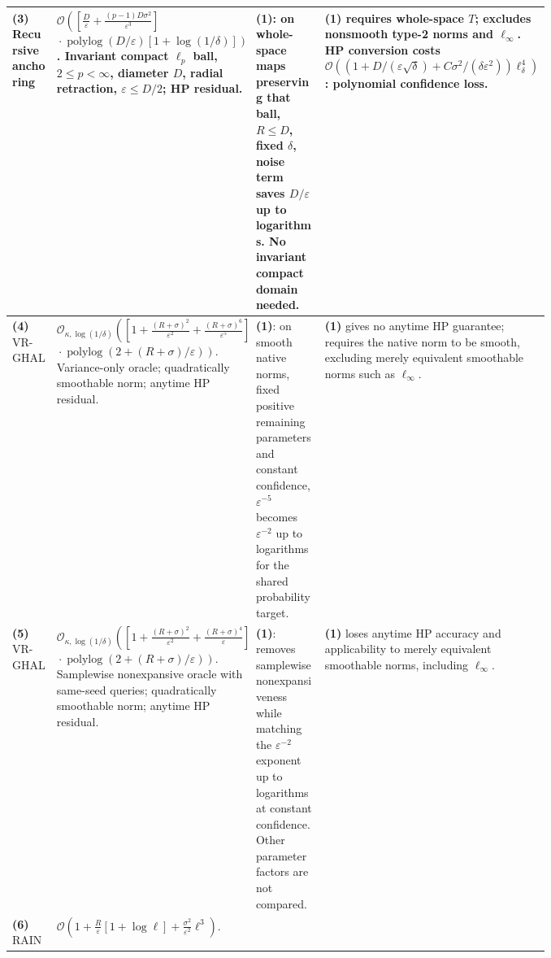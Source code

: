 \begin{table}[tp]
\begin{threeparttable}
\begin{tabularx}{\linewidth}{@{}>{\raggedright\arraybackslash}p{0.20\linewidth}>{\raggedright\arraybackslash}p{0.32\linewidth}>{\raggedright\arraybackslash}p{0.25\linewidth}>{\raggedright\arraybackslash}X@{}}
\midrule
\textbf{(3)} Recursive anchoring \citep[Thm.~5, Cor.~6]{ssbfpDgm2026v1}
& $\mathcal{O}\!\left(\left[\frac D\varepsilon+\frac{(p-1)D\sigma^2}{\varepsilon^3}\right]\right.$\newline
$\left.{}\cdot\operatorname{polylog}(D/\varepsilon)[1+\log(1/\delta)]\right)$.
Invariant compact $\ell_p$ ball, $2\leq p<\infty$, diameter $D$, radial retraction, $\varepsilon\leq D/2$; HP residual.
& \textbf{(1)}: on whole-space maps preserving that ball, $R\leq D$, fixed $\delta$, noise term saves $D/\varepsilon$ up to logarithms. No invariant compact domain needed.
& \textbf{(1)} requires whole-space $T$; excludes nonsmooth type-2 norms and $\ell_\infty$. HP conversion costs $\mathcal{O}((1+D/(\varepsilon\sqrt\delta)+C\sigma^2/(\delta\varepsilon^2))\ell_\delta^4)$: polynomial confidence loss. \\
\midrule
\textbf{(4)} VR-GHAL \citep[Cor.~1]{ssbfpDiakonikolas2026v1}
& $\mathcal{O}_{\kappa,\log(1/\delta)}\!\left(\left[1+\frac{(R+\sigma)^2}{\varepsilon^2}+\frac{(R+\sigma)^6}{\varepsilon^5}\right]\right.$\newline
$\left.{}\cdot\operatorname{polylog}(2+(R+\sigma)/\varepsilon)\right)$.
Variance-only oracle; quadratically smoothable norm; anytime HP residual.
& \textbf{(1)}: on smooth native norms, fixed positive remaining parameters and constant confidence, $\varepsilon^{-5}$ becomes $\varepsilon^{-2}$ up to logarithms for the shared probability target.
& \textbf{(1)} gives no anytime HP guarantee; requires the native norm to be smooth, excluding merely equivalent smoothable norms such as $\ell_\infty$. \\
\midrule
\textbf{(5)} VR-GHAL \citep[Cor.~3]{ssbfpDiakonikolas2026v1}
& $\mathcal{O}_{\kappa,\log(1/\delta)}\!\left(\left[1+\frac{(R+\sigma)^2}{\varepsilon^2}+\frac{(R+\sigma)^4}{\varepsilon}\right]\right.$\newline
$\left.{}\cdot\operatorname{polylog}(2+(R+\sigma)/\varepsilon)\right)$.
Samplewise nonexpansive oracle with same-seed queries; quadratically smoothable norm; anytime HP residual.
& \textbf{(1)}: removes samplewise nonexpansiveness while matching the $\varepsilon^{-2}$ exponent up to logarithms at constant confidence. Other parameter factors are not compared.
& \textbf{(1)} loses anytime HP accuracy and applicability to merely equivalent smoothable norms, including $\ell_\infty$. \\
\midrule
\textbf{(6)} RAIN \citep[Thm.~4.2 and subsequent remark]{ssbfpChenLuo2024}
& $\mathcal{O}\!\left(1+\frac R\varepsilon[1+\log\ell]+\frac{\sigma^2}{\varepsilon^2}\ell^3\right)$.

\end{tabularx}
\end{threeparttable}
\end{table}
